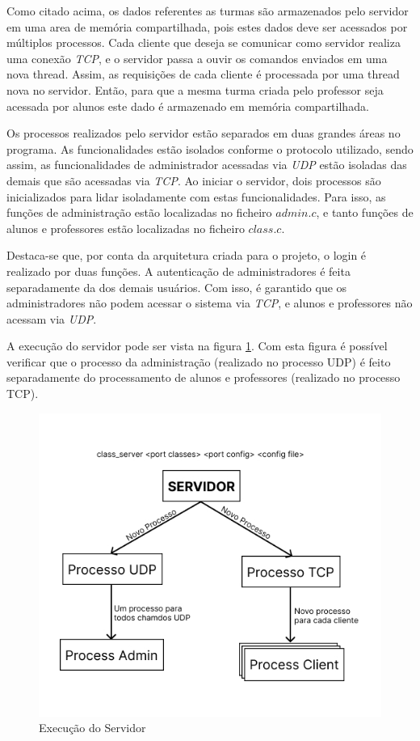 \documentclass[a4paper]{article}
\begin{document}
Como citado acima, os dados referentes as turmas são armazenados pelo servidor em uma area de memória compartilhada, pois estes dados deve ser acessados por múltiplos processos. Cada cliente que deseja se comunicar como servidor realiza uma conexão \textit{TCP}, e o servidor passa a ouvir os comandos enviados em uma nova thread. Assim, as requisições de cada cliente é processada por uma thread nova no servidor. Então, para que a mesma turma criada pelo professor seja acessada por alunos este dado é armazenado em memória compartilhada.


Os processos realizados pelo servidor estão separados em duas grandes áreas no programa. As funcionalidades estão isolados conforme o protocolo utilizado, sendo assim, as funcionalidades de administrador acessadas via \textit{UDP} estão isoladas das demais que são acessadas via \textit{TCP}. Ao iniciar o servidor, dois processos são inicializados para lidar isoladamente com estas funcionalidades. Para isso, as funções de administração estão localizadas no ficheiro \(admin.c\), e tanto funções de alunos e professores  estão localizadas no ficheiro \(class.c\).

Destaca-se que, por conta da arquitetura criada para o projeto, o login é realizado por duas funções. A autenticação de administradores é feita separadamente da dos demais usuários. Com isso, é garantido que os administradores não podem acessar o sistema via \textit{TCP}, e alunos e professores não acessam via \textit{UDP}.

A execução do servidor pode ser vista na figura \ref{fig:servidor}. Com esta figura é possível verificar que o processo da administração (realizado no processo UDP) é feito separadamente do processamento de alunos e professores (realizado no processo TCP).

\begin{figure}
    \centering
    \includegraphics[width=0.5\linewidth]{img/Servidor.jpg}
    \caption{Execução do Servidor}
    \label{fig:servidor}
\end{figure}
\end{document}
